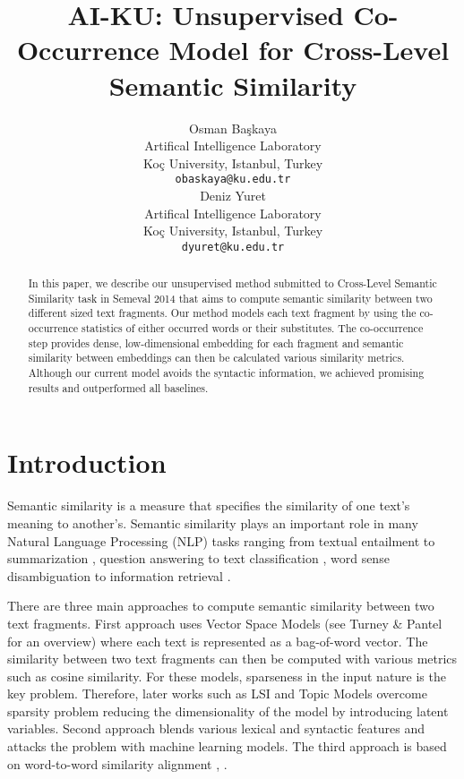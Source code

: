 \documentclass[11pt]{article}
\title{AI-KU: Unsupervised Co-Occurrence Model for Cross-Level Semantic Similarity}
\author{Osman Ba\c{s}kaya \\
	  Artifical Intelligence Laboratory \\
	  Ko\c{c} University, Istanbul, Turkey \\
  {\tt obaskaya@ku.edu.tr} \\\And
  Deniz Yuret \\
	  Artifical Intelligence Laboratory \\
	  Ko\c{c} University, Istanbul, Turkey \\
  {\tt dyuret@ku.edu.tr} \\}
\date{}
\begin{document}
\maketitle
\begin{abstract}

In this paper, we describe our unsupervised method submitted to Cross-Level Semantic Similarity task in Semeval 2014 that aims to compute semantic similarity between two different sized text fragments. Our method models each text fragment by using the co-occurrence statistics of either occurred words or their substitutes. The co-occurrence step provides dense, low-dimensional embedding for each fragment and semantic similarity between embeddings can then be calculated various similarity metrics. Although our current model avoids the syntactic information, we achieved promising results and outperformed all baselines.

\end{abstract}

\section{Introduction}
\label{intro}

Semantic similarity is a measure that specifies the similarity of one text's meaning to another's. Semantic similarity plays an important role in many Natural Language Processing (NLP) tasks ranging from textual entailment \cite{berant2012entail} to summarization \cite{lin2003summarization}, question answering \cite{surdeanu2011questionans} to text classification \cite{sebastiani2002textclass}, word sense disambiguation \cite{schutze98automatic} to information retrieval \cite{park2005infret}. 

There are three main approaches to compute semantic similarity between two text fragments. First approach uses Vector Space Models (see Turney \& Pantel  for an overview) where each text is represented as a bag-of-word vector. The similarity between two text fragments can then be computed with various metrics such as cosine similarity. For these models, sparseness in the input nature is the key problem. Therefore, later works such as LSI \cite{deerwester90indexing} and Topic Models \cite{blei03latent} overcome sparsity problem reducing the dimensionality of the model by introducing latent variables. Second approach blends various lexical and syntactic features and attacks the problem with machine learning models. The third approach is based on word-to-word similarity alignment \cite{pilehvar2013align}, \cite{islam2008semantic}.
\end{document}
